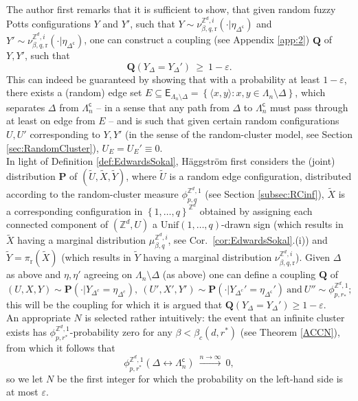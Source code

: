\documentclass[12pt]{article}
\newcommand{\E}{\mathsf{E}}
\newcommand{\PP}{\mathbf{P}}
\newcommand{\Q}{\mathbf{Q}}
\renewcommand{\r}{\mathrm{r}}
\newcommand{\Z}{\mathbb{Z}}
\newcommand{\set}[1]{\left\{#1\right\}}
\newcommand{\ra}{\rightarrow}
\newcommand{\pika}{\boldsymbol{\cdot}}
\newcommand{\1}{\mathbbm{1}}
\renewcommand{\sp}[1]{\langle #1\rangle}
\renewcommand{\c}{\mathsf{c}}
\newcommand{\5}{\vspace{0.5cm}}
\renewcommand{\tilde}{\widetilde}
\theoremstyle{definition}
\begin{document}
The author first remarks that it is sufficient to show, that given random fuzzy Potts configurations $Y$ and $Y'$, such that $Y\sim\nu_{\beta,q,\r}^{\Z^d,i}(\pika|\eta_{\Delta^\c})$ and $Y'\sim\nu_{\beta,q,\r}^{\Z^d,i}(\pika|\eta_{\Delta^\c})$, one can construct a coupling (see Appendix \ref{app:2}) $\Q$ of $Y,Y'$, such that
$$\Q(Y_{\Delta}=Y_{\Delta}') ~\geq~ 1-\varepsilon.$$
This can indeed be guaranteed by showing that with a probability at least $1-\varepsilon$, there exists a (random) edge set $E\subseteq\E_{\Lambda_n\setminus\Delta}=\set{\sp{x,y}:x,y\in\Lambda_n\setminus\Delta}$, which separates $\Delta$ from $\Lambda_n^\c$ -- in a sense that any path from $\Delta$ to $\Lambda_n^\c$ must pass through at least on edge from $E$ -- and is such that given certain random configurations $U,U'$ corresponding to $Y,Y'$ (in the sense of the random-cluster model, see Section \ref{sec:RandomCluster}), $U_E=U_E'\equiv 0$. \\

In light of Definition \ref{def:EdwardsSokal}, H\"aggstr\"om first considers the (joint) distribution $\PP$ of $(\tilde{U},\tilde{X},\tilde{Y})$, where $\tilde{U}$ is a random edge configuration, distributed according to the random-cluster measure $\phi_{p,q}^{\Z^d,1}$ (see Section \ref{subsec:RCinf}), $\tilde{X}$ is a corresponding configuration in $\set{1,\ldots,q}^{\Z^d}$ obtained by assigning each connected component of $(\Z^d,U)$ a $\mathrm{Unif}(1,\ldots,q)$-drawn sign (which results in $\tilde{X}$ having a marginal distribution $\mu_{\beta,q}^{\Z^d, i}$, see Cor.~\ref{cor:EdwardsSokal}.(i)) and $\tilde{Y}=\pi_\r(\tilde{X})$ (which results in $\tilde{Y}$ having a marginal distribution $\nu_{\beta,q,\r}^{\Z^d,i}$). Given $\Delta$ as above and $\eta,\eta'$ agreeing on $\Lambda_n\setminus\Delta$ (as above) one can define a coupling $\Q$ of 
$$(U,X,Y)\sim\PP(\pika|Y_{\Delta^c}=\eta_{\Delta^c}),~(U',X',Y')\sim\PP(\pika|Y_{\Delta^c}'=\eta_{\Delta^\c}')~\text{and}~U''\sim\phi_{p,r_*}^{\Z^d,1};$$
this will be the coupling for which it is argued that $\Q(Y_{\Delta}=Y_{\Delta}')\geq 1-\varepsilon$. \\

An appropriate $N$ is selected rather intuitively: the event that an infinite cluster exists has $\phi_{p,r^*}^{\Z^d,1}$-probability zero for any $\beta<\beta_c(d,r^*)$ (see Theorem \ref{ACCN}), from which it follows that
$$\phi_{p,r^*}^{\Z^d,1}(\Delta\leftrightarrow\Lambda_n^\c) ~\xrightarrow{n\ra\infty}~ 0,$$
so we let $N$ be the first integer for which the probability on the left-hand side is at most $\varepsilon$. \\
\end{document}
